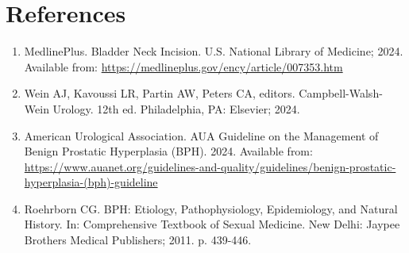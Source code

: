 \section*{References}
\begin{enumerate}
  \item MedlinePlus. Bladder Neck Incision. U.S. National Library of Medicine; 2024. Available from: \url{https://medlineplus.gov/ency/article/007353.htm}
  
  \item Wein AJ, Kavoussi LR, Partin AW, Peters CA, editors. Campbell-Walsh-Wein Urology. 12th ed. Philadelphia, PA: Elsevier; 2024.
  
  \item American Urological Association. AUA Guideline on the Management of Benign Prostatic Hyperplasia (BPH). 2024. Available from: \url{https://www.auanet.org/guidelines-and-quality/guidelines/benign-prostatic-hyperplasia-(bph)-guideline}
  
  \item Roehrborn CG. BPH: Etiology, Pathophysiology, Epidemiology, and Natural History. In: Comprehensive Textbook of Sexual Medicine. New Delhi: Jaypee Brothers Medical Publishers; 2011. p. 439-446.
\end{enumerate}

\clearpage
